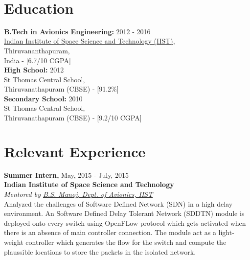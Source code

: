 \documentclass{resume}
\begin{document}


\begin{center}
\small{
		 \
		 \
	}
\end{center}

\smallskip
\begin{multicols}{2}

\section{Education}

\textbf{B.Tech in Avionics Engineering:} \hfill 2012 - 2016 \\
\href{http://iist.ac.in/}{Indian Institute of Space Science and Technology (IIST)},\\
Thiruvananthapuram,\\
India - [6.7/10 CGPA]\\[.05in]
\textbf{High School:} \hfill 2012\\ 
\href{http://www.stthomastvm.edu.in/central/index.aspx}{St Thomas Central School},\\ Thiruvanathapuram (CBSE) - [91.2\%]\\[.05in]
\textbf{Secondary School:} \hfill 2010\\  
St Thomas Central School,\\
Thiruvanathapuram (CBSE) - [9.2/10 CGPA]


\section{Relevant Experience}

\textbf{Summer Intern,} \hfill May, 2015 - July, 2015\\
\textbf{Indian Institute of Space Science and Technology}\\
\emph{Mentored by \href{https://www.iist.ac.in/avionics/bsmanoj}{B.S. Manoj, Dept. of Avionics, IIST}}\\
Analyzed the challenges of Software Defined Network (SDN) in a high delay environment. An Software Defined Delay Tolerant Network (SDDTN) module is deployed onto every switch using OpenFLow protocol which gets activated when there is an absence of main controller connection. The module act as a light-weight controller which generates the flow for the switch and compute the plaussible locations to store the packets in the isolated network. \\


\end{multicols}
\end{document}
